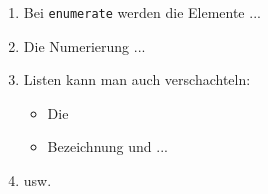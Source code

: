 \documentclass{article}
\begin{document}
\begin{enumerate}
 
\item Bei \texttt{enumerate}
werden die Elemente ...
 
\item Die Numerierung ...
 
\item Listen kann man auch
verschachteln:
  \begin{itemize}
  \item Die %
  \item Bezeichnung und ...
  \end{itemize}
 
\item usw.
\end{enumerate}
   
\end{document}
